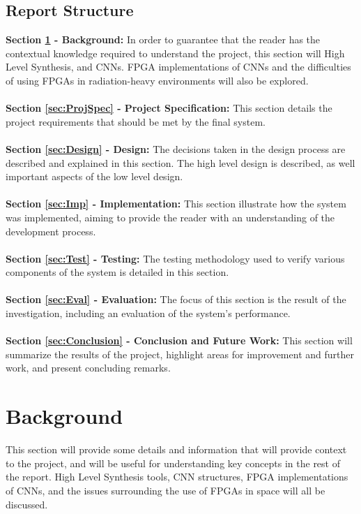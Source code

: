 \documentclass[12pt]{article}
\begin{document}
\subsection{Report Structure}
\label{sec:Intro-Structure}

\textbf{Section \ref{sec:Background} - Background:} In order to guarantee that the reader has the contextual knowledge required to understand the project, this section will High Level Synthesis, and CNNs. FPGA implementations of CNNs and the difficulties of using FPGAs in radiation-heavy environments will also be explored.\\
\\
\textbf{Section \ref{sec:ProjSpec} - Project Specification:} This section details the project requirements that should be met by the final system.\\
\\
\textbf{Section \ref{sec:Design} - Design:} The decisions taken in the design process are described and explained in this section. The high level design is described, as well important aspects of the low level design.\\
\\
\textbf{Section \ref{sec:Imp} - Implementation:} This section illustrate how the system was implemented, aiming to provide the reader with an understanding of the development process.\\
\\
\textbf{Section \ref{sec:Test} - Testing:} The testing methodology used to verify various components of the system is detailed in this section.\\
\\
\textbf{Section \ref{sec:Eval} - Evaluation:} The focus of this section is the result of the investigation, including an evaluation of the system's performance.\\
\\
\textbf{Section \ref{sec:Conclusion} - Conclusion and Future Work:} This section will summarize the results of the project, highlight areas for improvement and further work, and present concluding remarks.\\

\newpage

\section{Background}
\label{sec:Background}


This section will provide some details and information that will provide context to the project, and will be useful for understanding key concepts in the rest of the report. High Level Synthesis tools, CNN structures, FPGA implementations of CNNs, and the issues surrounding the use of FPGAs in space will all be discussed.
\end{document}
